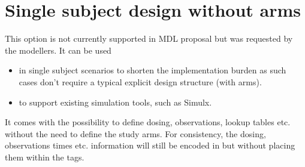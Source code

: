 \section{Single subject design without arms} 
\label{sec:noArms}
This option is not currently supported in MDL proposal but was requested by 
the modellers. It can be used 
\begin{itemize}
\item 
in single subject scenarios to shorten the implementation burden 
as such cases don't require a typical explicit design structure (with arms). 
\item 
to support existing simulation tools, such as Simulx.
\end{itemize}
It comes with the possibility to define dosing, observations, lookup tables 
etc. without the need to define the study arms. For consistency, the dosing,
observations times etc. information will still be encoded in  but 
without placing them within the  tags. 
